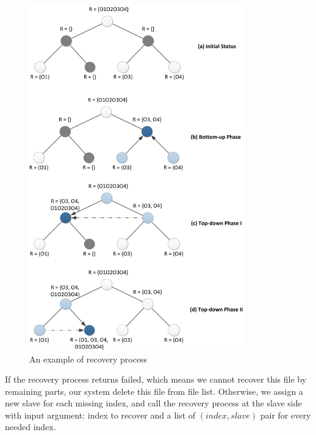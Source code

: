 \documentclass[conference]{IEEEtran}
\begin{document}
\begin{figure}
	\centering
		\includegraphics[height=150mm]{recovery.jpg}
		\caption{An example of recovery process}
	\label{fig:rec}
\end{figure}

If the recovery process returns failed, which means we cannot recover this file by remaining parts, our system delete this file from file list. Otherwise, we assign a new slave for each missing index, and call the recovery process at the slave side with input argument: index to recover and a list of $(index, slave)$ pair for every needed index.
\end{document}
